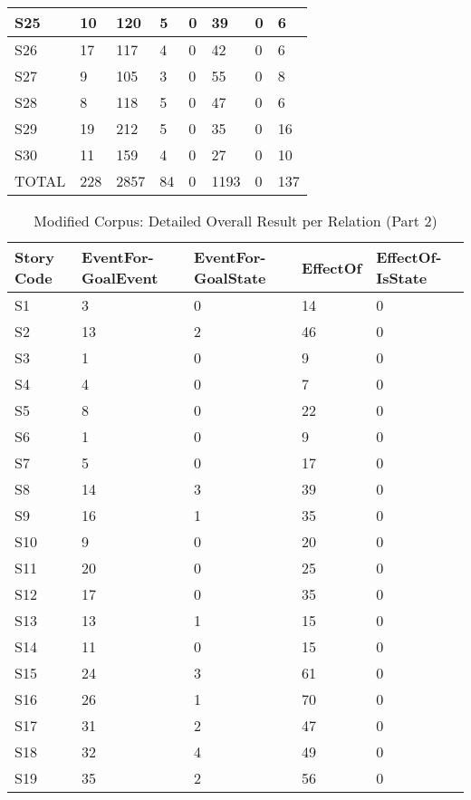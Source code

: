 \begin{table}[H]
\begin{tabular}{|p{1.5cm}|p{.75cm}|p{1.5cm}|p{1cm}|p{1.25cm}|p{1.25cm}|p{1.5cm}|p{1.5cm}|}
S25 & 10 & 120 & 5 & 0 & 39 & 0 & 6 \\ \hline
S26 & 17 & 117 & 4 & 0 & 42 & 0 & 6 \\ \hline
S27 & 9 & 105 & 3 & 0 & 55 & 0 & 8 \\ \hline
S28 & 8 & 118 & 5 & 0 & 47 & 0 & 6 \\ \hline
S29 & 19 & 212 & 5 & 0 & 35 & 0 & 16 \\ \hline
S30 & 11 & 159 & 4 & 0 & 27 & 0 & 10 \\ \hline
TOTAL & 228 & 2857 & 84 & 0 & 1193 & 0 & 137 \\ \hline
\end{tabular}
\label{tab:mod1}
\end{table}

\begin{table}[H]   %
\centering
\caption{Modified Corpus: Detailed Overall Result per Relation (Part 2)} \vspace{0.25em}
\begin{tabular}{|l|p{2cm}|p{2cm}|l|p{2cm}|} \hline
\textbf{Story Code} & \textbf{EventFor-GoalEvent} & \textbf{EventFor-GoalState} & \textbf{EffectOf} & \textbf{EffectOf-IsState} \\ \hline
S1 & 3 & 0 & 14 & 0 \\ \hline
S2 & 13 & 2 & 46 & 0 \\ \hline
S3 & 1 & 0 & 9 & 0 \\ \hline
S4 & 4 & 0 & 7 & 0 \\ \hline
S5 & 8 & 0 & 22 & 0 \\ \hline
S6 & 1 & 0 & 9 & 0 \\ \hline
S7 & 5 & 0 & 17 & 0 \\ \hline
S8 & 14 & 3 & 39 & 0 \\ \hline
S9 & 16 & 1 & 35 & 0 \\ \hline
S10 & 9 & 0 & 20 & 0 \\ \hline
S11 & 20 & 0 & 25 & 0 \\ \hline
S12 & 17 & 0 & 35 & 0 \\ \hline
S13 & 13 & 1 & 15 & 0 \\ \hline
S14 & 11 & 0 & 15 & 0 \\ \hline
S15 & 24 & 3 & 61 & 0 \\ \hline
S16 & 26 & 1 & 70 & 0 \\ \hline
S17 & 31 & 2 & 47 & 0 \\ \hline
S18 & 32 & 4 & 49 & 0 \\ \hline
S19 & 35 & 2 & 56 & 0 \\ \hline

\end{tabular}
\end{table}

